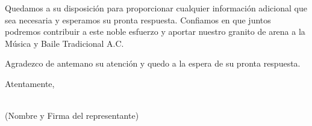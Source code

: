 \documentclass[a4paper,12pt]{letter}
\begin{document}
Quedamos a su disposición para proporcionar cualquier información adicional que sea necesaria y esperamos su pronta respuesta. Confiamos en que juntos podremos contribuir a este noble esfuerzo y aportar nuestro granito de arena a la Música y Baile Tradicional A.C.

Agradezco de antemano su atención y quedo a la espera de su pronta respuesta.

Atentamente,

\vspace{1cm}
\underline{\hspace{10cm}} \hfill  \\
(Nombre y Firma del representante) 
\end{document}
